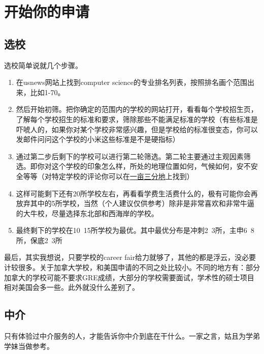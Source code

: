 \chapter{开始你的申请}
\newpage
\section{选校}

选校简单说就几个步骤。
\begin{enumerate}
\item 在usnews网站上找到computer science的专业排名列表，按照排名画个范围出来，比如1-70。

\item 然后开始初筛。把你确定的范围内的学校的网站打开，看看每个学校招生页，了解每个学校招生的标准和要求，筛除那些不能满足标准的学校（有些标准是吓唬人的，如果你对某个学校非常感兴趣，但是学校给的标准很变态，你可以发邮件问问这个学校的小米这些标准是不是硬指标）

\item 通过第二步后剩下的学校可以进行第二轮筛选。第二轮主要通过主观因素筛选。即你对这个学校的印象怎么样，所处的地理位置如何，气候如何，安不安全等等（对特定学校的评论你可以在\href{http://www.1point3acres.com/bbs}{一亩三分地}上找到）

\item 这样可能剩下还有20所学校左右，再看看学费生活费什么的，极有可能你会再放弃其中的5所学校，当然（个人建议仅供参考）除非是非常喜欢和非常牛逼的大牛校，尽量选择东北部和西海岸的学校。

\item 最终剩下的学校在10~15所学校为最优。其中最优分布是冲刺2~3所，主申6~8所，保底2~3所
\end{enumerate}

最后，其实我想说，只要学校的career fair给力就够了，其他的都是浮云，没必要计较很多。关于加拿大学校，和美国申请的不同之处比较小。不同的地方有：部分加拿大的学校可能不要求GRE成绩，大部分的学校需要面试，学术性的硕士项目相对美国会多一些。此外就没什么差别了。

\section{中介}
只有体验过中介服务的人，才能告诉你中介到底在干什么。一家之言，姑且为学弟学妹当做参考。
